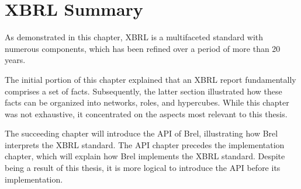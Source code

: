\section{XBRL Summary}

As demonstrated in this chapter, XBRL is a multifaceted standard with numerous components,
which has been refined over a period of more than 20 years.

The initial portion of this chapter explained that an XBRL report fundamentally comprises a set of facts.
Subsequently, the latter section illustrated how these facts can be organized into networks, roles, and hypercubes.
While this chapter was not exhaustive, it concentrated on the aspects most relevant to this thesis.

The succeeding chapter will introduce the API of Brel, 
illustrating how Brel interprets the XBRL standard.
The API chapter precedes the implementation chapter, which will explain how Brel implements the XBRL standard.
Despite being a result of this thesis, it is more logical to introduce the API before its implementation.
